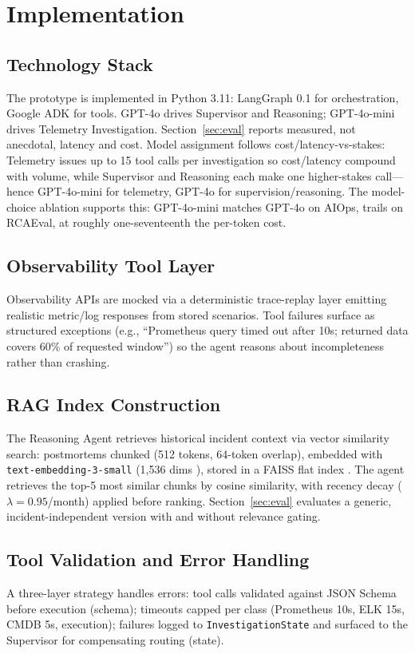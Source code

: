 \documentclass[10pt,conference]{IEEEtran}
\begin{document}
\section{Implementation}
\label{sec:impl}

\subsection{Technology Stack}
The prototype is implemented in Python 3.11: LangGraph 0.1 for
orchestration, Google ADK for tools. GPT-4o \cite{openai2023gpt4} drives
Supervisor and Reasoning; GPT-4o-mini drives Telemetry Investigation.
Section~\ref{sec:eval} reports measured, not anecdotal, latency and cost.
Model assignment follows cost/latency-vs-stakes: Telemetry issues up to 15
tool calls per investigation so cost/latency compound with volume, while
Supervisor and Reasoning each make one higher-stakes call---hence
GPT-4o-mini for telemetry, GPT-4o for supervision/reasoning. The
model-choice ablation supports this: GPT-4o-mini matches GPT-4o on AIOps,
trails on RCAEval, at roughly one-seventeenth the per-token cost.

\subsection{Observability Tool Layer}
Observability APIs are mocked via a deterministic trace-replay layer
emitting realistic metric/log responses from stored scenarios. Tool
failures surface as structured exceptions (e.g., ``Prometheus query timed
out after 10s; returned data covers 60\% of requested window'') so the
agent reasons about incompleteness rather than crashing.

\subsection{RAG Index Construction}
The Reasoning Agent retrieves historical incident context via vector
similarity search: postmortems chunked (512 tokens, 64-token overlap),
embedded with \texttt{text-embedding-3-small} (1,536 dims
\cite{devlin2019bert}), stored in a FAISS flat index
\cite{johnson2021faiss}. The agent retrieves the top-5 most similar chunks
by cosine similarity, with recency decay ($\lambda=0.95$/month) applied
before ranking. Section~\ref{sec:eval} evaluates a generic,
incident-independent version with and without relevance gating.

\subsection{Tool Validation and Error Handling}
A three-layer strategy handles errors: tool calls validated against JSON
Schema before execution (schema); timeouts capped per class (Prometheus
10s, ELK 15s, CMDB 5s, execution); failures logged to
\texttt{InvestigationState} and surfaced to the Supervisor for compensating
routing (state).
\end{document}
